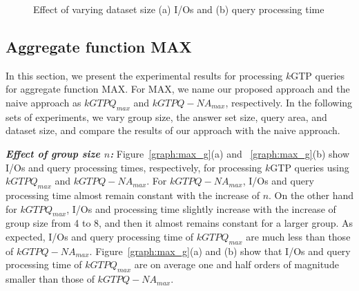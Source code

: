 \begin{figure}[htbp]
\begin{center}
\begin{tabular}{cc}
        \end{tabular}
    \caption{Effect of varying dataset size (a) I/Os and (b) query processing time}
    \label{graph:sum_u}
  \end{center}
   \vspace{-6mm}
\end{figure}
\vspace*{10pt}

\subsection{Aggregate function MAX}
\label{subsec:max}
In this section, we present the experimental results for processing $k$GTP queries for aggregate function MAX. For MAX, we name our proposed approach and the naive approach as $kGTPQ_{max}$ and $kGTPQ-NA_{max}$, respectively. In the following sets of experiments, we vary group size, the answer set size, query area, and dataset size, and compare the results of our approach with the naive approach.


\textbf{\emph{Effect of group size $n$: }}Figure~\ref{graph:max_g}(a) and ~\ref{graph:max_g}(b) show I/Os and query processing times, respectively, for processing $k$GTP queries using $kGTPQ_{max}$ and $kGTPQ-NA_{max}$. For $kGTPQ-NA_{max}$, I/Os and query processing time almost remain constant with the increase of $n$. On the other hand for $kGTPQ_{max}$, I/Os and processing time slightly increase with the increase of group size from 4 to 8, and then it almost remains constant for a larger group. As expected, I/Os and query processing time of $kGTPQ_{max}$ are much less than those of $kGTPQ-NA_{max}$. Figure~\ref{graph:max_g}(a) and (b) show that I/Os and query processing time of $kGTPQ_{max}$ are on average one and half orders of magnitude smaller than those of $kGTPQ-NA_{max}$.

